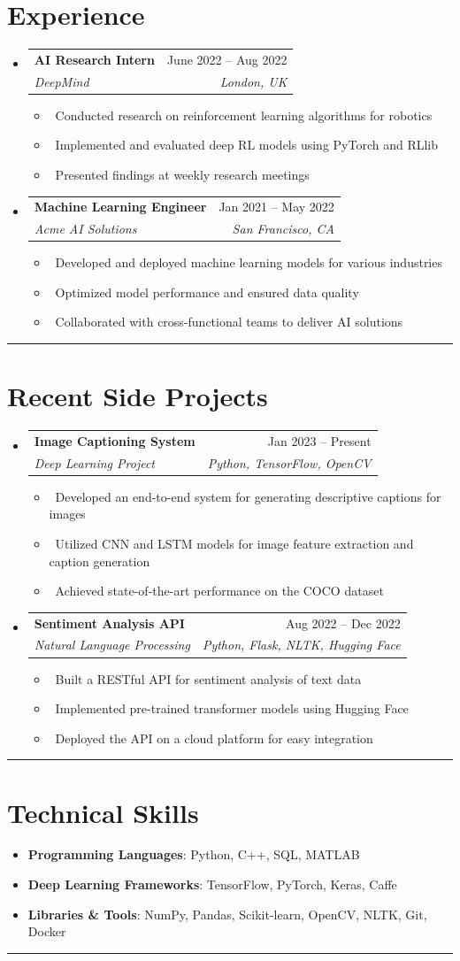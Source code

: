 \documentclass[letterpaper,10pt]{article}
\makeatletter
\newcommand{\grayborder}[1][5pt]{%
    \vspace{#1}%
    {\color{lightgray}\hrule}%
}
\newcommand{\resumeItem}[1]{\item\small{#1}}
\newcommand{\resumeSubheading}[4]{
\vspace{-1pt}\item
  \begin{tabular*}{0.97\textwidth}[t]{l@{\extracolsep{\fill}}r}
    \textbf{#1} & #2 \\
    \textit{#3} & \textit{#4} \\
  \end{tabular*}\vspace{-7pt}
}
\newcommand{\resumeSubHeadingList}{\begin{itemize}[leftmargin=0.15in, label={}]}
\newcommand{\resumeSubHeadingListEnd}{\end{itemize}}
\makeatother
\begin{document}
\section{Experience}
\resumeSubHeadingList
\resumeSubheading
{AI Research Intern}{June 2022 -- Aug 2022}
{DeepMind}{London, UK}
\resumeSubHeadingList
\resumeItem{\textbullet\ Conducted research on reinforcement learning algorithms for robotics}
\resumeItem{\textbullet\ Implemented and evaluated deep RL models using PyTorch and RLlib}
\resumeItem{\textbullet\ Presented findings at weekly research meetings}
\resumeSubHeadingListEnd
\resumeSubheading
{Machine Learning Engineer}{Jan 2021 -- May 2022}
{Acme AI Solutions}{San Francisco, CA}
\resumeSubHeadingList
\resumeItem{\textbullet\ Developed and deployed machine learning models for various industries}
\resumeItem{\textbullet\ Optimized model performance and ensured data quality}
\resumeItem{\textbullet\ Collaborated with cross-functional teams to deliver AI solutions}
\resumeSubHeadingListEnd
\resumeSubHeadingListEnd
\grayborder





\section{Recent Side Projects}
\resumeSubHeadingList
\resumeSubheading
{Image Captioning System}{Jan 2023 -- Present}
{Deep Learning Project}{Python, TensorFlow, OpenCV}
\resumeSubHeadingList
\resumeItem{\textbullet\ Developed an end-to-end system for generating descriptive captions for images}
\resumeItem{\textbullet\ Utilized CNN and LSTM models for image feature extraction and caption generation}
\resumeItem{\textbullet\ Achieved state-of-the-art performance on the COCO dataset}
\resumeSubHeadingListEnd
\resumeSubheading
{Sentiment Analysis API}{Aug 2022 -- Dec 2022}
{Natural Language Processing}{Python, Flask, NLTK, Hugging Face}
\resumeSubHeadingList
\resumeItem{\textbullet\ Built a RESTful API for sentiment analysis of text data}
\resumeItem{\textbullet\ Implemented pre-trained transformer models using Hugging Face}
\resumeItem{\textbullet\ Deployed the API on a cloud platform for easy integration}
\resumeSubHeadingListEnd
\resumeSubHeadingListEnd
\grayborder





\section{Technical Skills}
\resumeSubHeadingList
\resumeItem{\textbf{Programming Languages}: Python, C++, SQL, MATLAB}
\resumeItem{\textbf{Deep Learning Frameworks}: TensorFlow, PyTorch, Keras, Caffe}
\resumeItem{\textbf{Libraries \& Tools}: NumPy, Pandas, Scikit-learn, OpenCV, NLTK, Git, Docker}
\resumeSubHeadingListEnd
\grayborder
\end{document}
